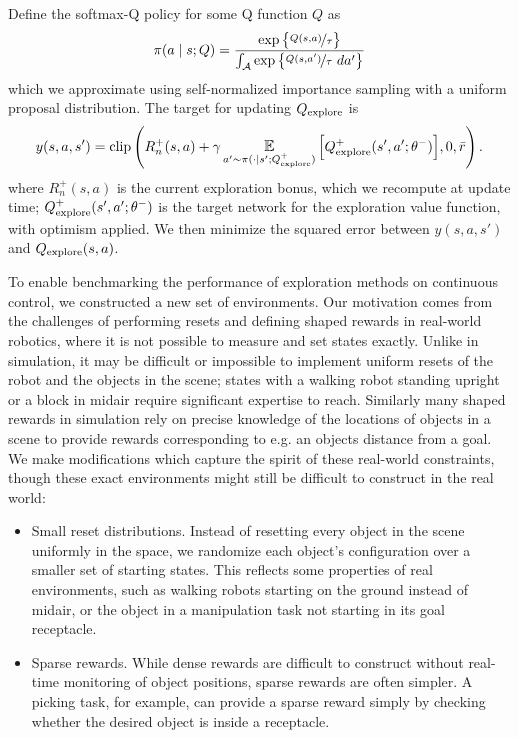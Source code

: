 \begin{subappendices}
Define the softmax-Q policy for some Q function $Q$ as
\begin{align}
    \pi(a \mid s; Q) = \frac{\exp \big\{ \nicefrac{Q(s, a)}{\tau} \big\}}{\int_\mathcal{A} \exp \big\{ \nicefrac{Q(s, a')}{\tau}  ~da' \big\}}
\end{align}
which we approximate using self-normalized importance sampling with a uniform proposal distribution.
The target for updating $Q_{\text{explore}}$ is
\begin{align} \label{eq:update_target}
    y(s, a, s') = \text{clip} \left( R^+_n(s, a) + \gamma \E_{a' \sim \pi(\cdot \mid s'; \qex^+)} \Big[ \qex^+(s', a'; \theta^-) \Big], 0, \bar{r} \right).
\end{align}
where $R^+_n(s, a)$ is the current exploration bonus, which we recompute at update time; $Q_{\text{explore}}^+(s', a'; \theta^-)$ is the target network for the exploration value function, with optimism applied.
We then minimize the squared error between $y(s, a, s')$ and $Q_{\text{explore}}(s, a)$.


 \label{sec:environments_appendix}

To enable benchmarking the performance of exploration methods on continuous control, we constructed a new set of environments.
Our motivation comes from the challenges of performing resets and defining shaped rewards in real-world robotics, where it is not possible to measure and set states exactly.
Unlike in simulation, it may be difficult or impossible to implement uniform resets of the robot and the objects in the scene; states with a walking robot standing upright or a block in midair require significant expertise to reach.
Similarly many shaped rewards in simulation rely on precise knowledge of the locations of objects in a scene to provide rewards corresponding to e.g. an objects distance from a goal.
We make modifications which capture the spirit of these real-world constraints, though these exact environments might still be difficult to construct in the real world:
\begin{itemize}
    \item Small reset distributions.
    Instead of resetting every object in the scene uniformly in the space, we randomize each object's configuration over a smaller set of starting states.
    This reflects some properties of real environments, such as walking robots starting on the ground instead of midair, or the object in a manipulation task not starting in its goal receptacle.
    \item Sparse rewards.
    While dense rewards are difficult to construct without real-time monitoring of object positions, sparse rewards are often simpler.
    A picking task, for example, can provide a sparse reward simply by checking whether the desired object is inside a receptacle.
\end{itemize}


\end{subappendices}
